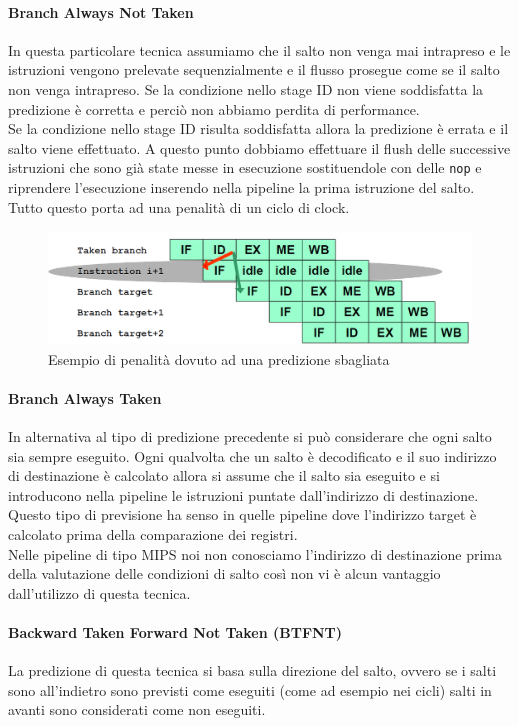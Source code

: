 \paragraph{Branch Always Not Taken}
In questa particolare tecnica assumiamo che il salto non venga mai intrapreso e    le istruzioni vengono prelevate sequenzialmente e il flusso prosegue come se il  salto non venga intrapreso. Se la condizione nello stage ID non viene soddisfatta la predizione è corretta e perciò non abbiamo perdita di performance.\\
Se la condizione nello stage ID risulta soddisfatta allora la predizione è errata e il salto viene effettuato. A questo punto dobbiamo effettuare il flush delle successive istruzioni che sono già state messe in esecuzione sostituendole con delle \texttt{nop} e riprendere l'esecuzione inserendo nella pipeline la prima istruzione del salto. Tutto questo porta ad una penalità di un ciclo di clock.
\begin{figure}[htb]
\centering
\includegraphics[scale=0.5]{img/branchpenality.png}
\caption{Esempio di penalità dovuto ad una predizione sbagliata}\label{fig:bantpenality}
\end{figure}
\paragraph{Branch Always Taken}
In alternativa al tipo di predizione precedente si può considerare che ogni salto sia sempre eseguito. Ogni qualvolta che un salto è decodificato e il suo indirizzo di destinazione è calcolato allora si assume che il salto sia eseguito e si introducono nella pipeline le istruzioni puntate dall'indirizzo di destinazione. Questo tipo di previsione ha senso in quelle pipeline dove l'indirizzo target è calcolato prima della comparazione dei registri.\\
Nelle pipeline di tipo MIPS noi non conosciamo l'indirizzo di destinazione prima della valutazione delle condizioni di salto così non vi è alcun vantaggio dall'utilizzo di questa tecnica.
\paragraph{Backward Taken Forward Not Taken (BTFNT)}
La predizione di questa tecnica si basa sulla direzione del salto, ovvero se i salti sono all'indietro sono previsti come eseguiti (come ad esempio nei cicli) salti in avanti sono considerati come non eseguiti.
